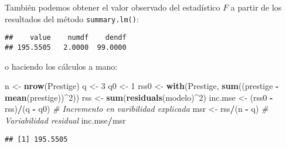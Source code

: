 \documentclass[
]{book}
\newenvironment{Shaded}{\begin{snugshade}}{\end{snugshade}}
\newcommand{\CommentTok}[1]{\textcolor[rgb]{0.56,0.35,0.01}{\textit{#1}}}
\newcommand{\DecValTok}[1]{\textcolor[rgb]{0.00,0.00,0.81}{#1}}
\newcommand{\KeywordTok}[1]{\textcolor[rgb]{0.13,0.29,0.53}{\textbf{#1}}}
\newcommand{\NormalTok}[1]{#1}
\newcommand{\OperatorTok}[1]{\textcolor[rgb]{0.81,0.36,0.00}{\textbf{#1}}}
\newcommand{\StringTok}[1]{\textcolor[rgb]{0.31,0.60,0.02}{#1}}
\theoremstyle{break}
\theoremstyle{definition}
\theoremstyle{definition}
\theoremstyle{definition}
\theoremstyle{remark}
\begin{document}
También podemos obtener el valor observado del estadístico \(F\)
a partir de los resultados del método \texttt{summary.lm()}:

\begin{Shaded}
\end{Shaded}

\begin{verbatim}
##    value    numdf    dendf 
## 195.5505   2.0000  99.0000
\end{verbatim}

o haciendo los cálculos a mano:

\begin{Shaded}
\begin{Highlighting}[]
\NormalTok{n <-}\StringTok{ }\KeywordTok{nrow}\NormalTok{(Prestige)}
\NormalTok{q <-}\StringTok{ }\DecValTok{3}
\NormalTok{q0 <-}\StringTok{ }\DecValTok{1}
\NormalTok{rss0 <-}\StringTok{ }\KeywordTok{with}\NormalTok{(Prestige, }\KeywordTok{sum}\NormalTok{((prestige }\OperatorTok{-}\StringTok{ }\KeywordTok{mean}\NormalTok{(prestige))}\OperatorTok{^}\DecValTok{2}\NormalTok{))}
\NormalTok{rss <-}\StringTok{ }\KeywordTok{sum}\NormalTok{(}\KeywordTok{residuals}\NormalTok{(modelo)}\OperatorTok{^}\DecValTok{2}\NormalTok{)}
\NormalTok{inc.mse <-}\StringTok{ }\NormalTok{(rss0 }\OperatorTok{-}\StringTok{ }\NormalTok{rss)}\OperatorTok{/}\NormalTok{(q }\OperatorTok{-}\StringTok{ }\NormalTok{q0)  }\CommentTok{# Incremento en varibilidad explicada}
\NormalTok{msr <-}\StringTok{  }\NormalTok{rss}\OperatorTok{/}\NormalTok{(n }\OperatorTok{-}\StringTok{ }\NormalTok{q)               }\CommentTok{# Variabilidad residual}
\NormalTok{inc.mse}\OperatorTok{/}\NormalTok{msr}
\end{Highlighting}
\end{Shaded}

\begin{verbatim}
## [1] 195.5505
\end{verbatim}
\end{document}
